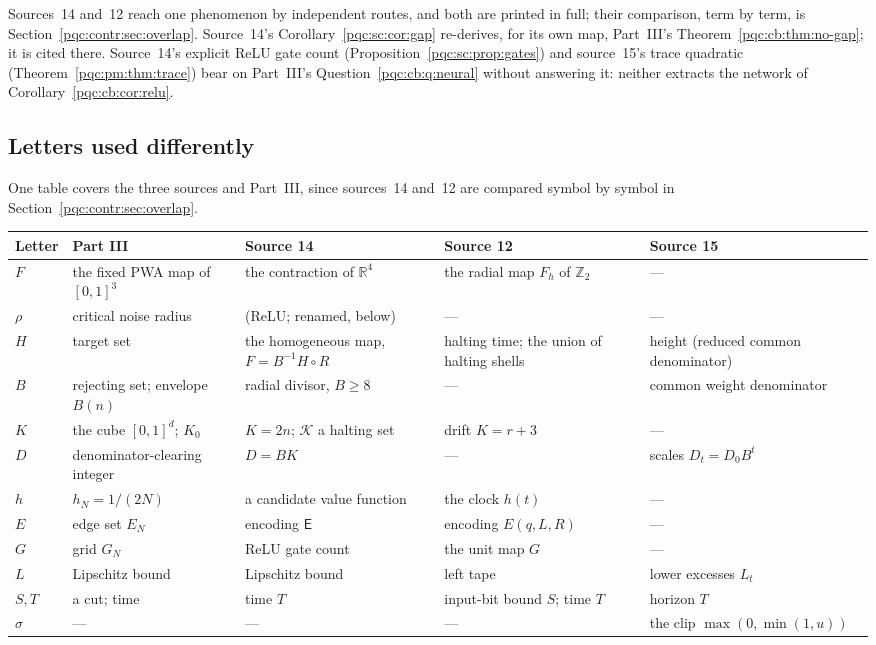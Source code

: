 \documentclass[11pt,letterpaper]{article}
\numberwithin{equation}{section}
\theoremstyle{definition}
\theoremstyle{remark}
\newcommand{\R}{\mathbb R}
\newcommand{\Ztwo}{\mathbb Z_2}
\newcommand{\Enc}{\mathsf E}
\begin{document}
Sources~14 and~12 reach one phenomenon by independent routes, and both are
printed in full; their comparison, term by term, is
Section~\ref{pqc:contr:sec:overlap}. Source~14's Corollary~\ref{pqc:sc:cor:gap}
re-derives, for its own map, Part~III's Theorem~\ref{pqc:cb:thm:no-gap}; it is
cited there. Source~14's explicit ReLU gate count
(Proposition~\ref{pqc:sc:prop:gates}) and source~15's trace quadratic
(Theorem~\ref{pqc:pm:thm:trace}) bear on Part~III's
Question~\ref{pqc:cb:q:neural} without answering it: neither extracts the
network of Corollary~\ref{pqc:cb:cor:relu}.

\subsection{Letters used differently}
\label{pqc:conv:b62-VII:letters}
One table covers the three sources and Part~III, since sources~14 and~12 are
compared symbol by symbol in Section~\ref{pqc:contr:sec:overlap}.

\begin{center}
\small
\begin{tabularx}{\textwidth}{@{}lYYYY@{}}
\toprule
Letter & Part III & Source 14 & Source 12 & Source 15\\
\midrule
$F$ & the fixed PWA map of $[0,1]^3$ & the contraction of $\R^4$ & the radial map $F_h$ of $\Ztwo$ & ---\\
$\rho$ & critical noise radius & (ReLU; renamed, below) & --- & ---\\
$H$ & target set & the homogeneous map, $F=B^{-1}H\circ R$ & halting time; the union of halting shells & height (reduced common denominator)\\
$B$ & rejecting set; envelope $B(n)$ & radial divisor, $B\ge8$ & --- & common weight denominator\\
$K$ & the cube $[0,1]^d$; $K_0$ & $K=2n$; $\mathcal K$ a halting set & drift $K=r+3$ & ---\\
$D$ & denominator-clearing integer & $D=BK$ & --- & scales $D_t=D_0B^t$\\
$h$ & $h_N=1/(2N)$ & a candidate value function & the clock $h(t)$ & ---\\
$E$ & edge set $E_N$ & encoding $\Enc$ & encoding $E(q,L,R)$ & ---\\
$G$ & grid $G_N$ & ReLU gate count & the unit map $G$ & ---\\
$L$ & Lipschitz bound & Lipschitz bound & left tape & lower excesses $L_t$\\
$S,T$ & a cut; time & time $T$ & input-bit bound $S$; time $T$ & horizon $T$\\
$\sigma$ & --- & --- & --- & the clip $\max(0,\min(1,u))$\\
\bottomrule
\end{tabularx}
\end{center}
\end{document}
